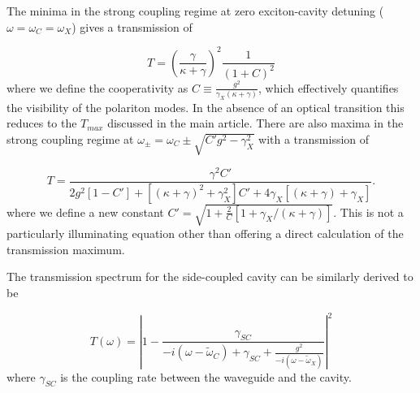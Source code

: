 \documentclass{achemso}
\begin{document}
The minima in the strong coupling regime at zero exciton-cavity detuning ($\omega = \omega_{C} = \omega_{X}$) gives a transmission of 

\begin{equation}
	T = \left ( \frac{\gamma}{\kappa + \gamma} \right )^2 \frac{1}{\left( 1 + C \right)^2}
\end{equation}
where we define the cooperativity as $C \equiv \frac{g^2}{\gamma_{X} (\kappa + \gamma)}$, which effectively quantifies the visibility of the polariton modes. In the absence of an optical transition this reduces to the $T_{max}$ discussed in the main article. There are also maxima in the strong coupling regime at $\omega_{\pm} = \omega_{C} \pm \sqrt{C' g^2 - \gamma_{X}^2}$ with a transmission of

\begin{equation}\label{Tmaxg}
	T = \frac{\gamma^2 C'}{2 g^2 \left[1 - C' \right] + \left[ (\kappa + \gamma)^2 + \gamma_{X}^2 \right] C' + 4 \gamma_{X} \left[ (\kappa + \gamma) + \gamma_{X} \right]}.
\end{equation}
where we define a new constant $C' =  \sqrt{1 + \frac{2}{C} [1 + \gamma_{X} / (\kappa + \gamma)]}$. This is not a particularly illuminating equation other than offering a direct calculation of the transmission maximum. 


The transmission spectrum for the side-coupled cavity can be similarly derived \cite{fan_input-output_2010, rephaeli_few-photon_2012} to be

\begin{equation}
	T(\omega) = \left|1 - \frac{\gamma_{SC}}{-i (\omega - \tilde{\omega}_{C}) + \gamma_{SC} + \frac{g^2}{-i (\omega - \tilde{\omega}_{X})}} \right|^2
\end{equation}
where $\gamma_{SC}$ is the coupling rate between the waveguide and the cavity.


%				
\end{document}
